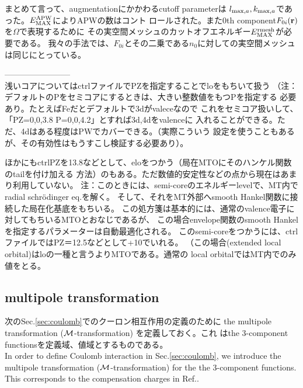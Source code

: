 \documentclass[twocolumn,showpacs,preprintnumbers,amsmath,amssymb,floatfix]{revtex4-1}
\newcommand{\bfr}{{\bf r}}
\def\EMAX{  E^{\rm APW}_{\rm MAX} }
\def\EMAXm{ E^{\rm rmesh}_{\rm MAX} }
\def\EMAX{  E^{\rm APW}_{\rm MAX} }
\def\EMAXm{ E^{\rm rmesh}_{\rm MAX} }
\def\MM{{\cal M}}
\def\EMAX{  E^{\rm APW}_{\rm MAX} }
\def\EMAXm{ E^{\rm rmesh}_{\rm MAX} }
\def\EMAX{  E^{\rm APW}_{\rm MAX} }
\def\EMAXm{ E^{\rm rmesh}_{\rm MAX} }
\def\MM{{\cal M}}
\def\EMAX{  E^{\rm APW}_{\rm MAX} }
\begin{document}
まとめて言って、augmentationにかかわるcutoff parameterは
$l_{{\rm max},a},k_{{\rm max},a}$であった。$\EMAX$によりAPWの数はコント
ロールされた。また0th component$F_{0i}(\bfr)$ を$\Omega$で表現するために
その実空間メッシュのカットオフエネルギー$\EMAXm$が必要である。
我々の手法では、$F_{0i}$とその二乗である$n_0$に対しての実空間メッシュは同じにとっている。



------------------------\\
浅いコアについてはctrlファイルでPZを指定することでloをもちいて扱う
（注：デフォルトのPをセミコアにするときは、大きい整数値をもつPを指定する
必要あり。たとえばFeだとデフォルトで3dがvaleceなので
これをセミコア扱いして、「PZ=0,0,3.8 P=0,0,4.2」とすれば3d,4dをvalenceに
入れることができる。ただ、4dはある程度はPWでカバーできる。（実際こういう
設定を使うこともあるが、その有効性はもうすこし検証する必要あり）。

{\small 
ほかにもctrlPZを13.8などとして、eloをつかう（局在MTOにそのハンケル関数のtailを付け加える
方法）のもある。ただ数値的安定性などの点から現在はあまり利用していない。
注：このときには、semi-coreのエネルギーlevelで、MT内でradial schr\"odinger eq.を解く。
そして、それをMT外部へsmooth Hankel関数に接続した局在化基底をもちいる。
この処方箋は基本的には、通常のvalence電子に対してもちいるMTOとおなじであるが、
この場合envelope関数のsmooth Hankelを指定するパラメーターは自動最適化される。
このsemi-coreをつかうには、ctrlファイルではPZ＝12.5などとして+10でいれる。
（この場合(extended local orbital)はloの一種と言うよりMTOである。通常の
local orbitalではMT内でのみ値をとる。}


\subsection{multipole transformation}
\label{sec:multi} 
次のSec.\ref{sec:coulomb}でのクーロン相互作用の定義のために
the multipole transformation ($\MM$-transformation) を定義しておく。これ
はthe 3-component functionsを定義域、値域とするものである。\\
In order to define Coulomb interaction in
Sec.\ref{sec:coulomb}, we introduce the multipole transformation
($\MM$-transformation) for the the 3-component functions.  This
corresponds to the compensation charges in Ref.\cite{PAW}.
\end{document}
